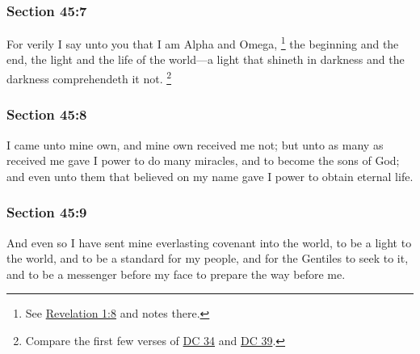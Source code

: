 	\subsubsection{Section 45:7} %
		\label{DC45-7}

		For verily I say unto you that I am Alpha and Omega,%
		\footnote{%
			See \hyperref[REVELATIONNT-1-8]{Revelation 1:8} and notes there.
			} 
		the beginning and the end, the light and the life of the world---a light that shineth in darkness and the darkness comprehendeth it not.%
			\footnote{%
				Compare the first few verses of \hyperref[DC34]{DC 34} and \hyperref[DC39]{DC 39}.
				}


	\subsubsection{Section 45:8} %
		\label{DC45-8}

		I came unto mine own, and mine own received me not; but unto as many as received me gave I power to do many miracles, and to become the sons of God; and even unto them that believed on my name gave I power to obtain eternal life.


	\subsubsection{Section 45:9} %
		\label{DC45-9}

		And even so I have sent mine everlasting covenant into the world, to be a light to the world, and to be a standard for my people, and for the Gentiles to seek to it, and to be a messenger before my face to prepare the way before me.

